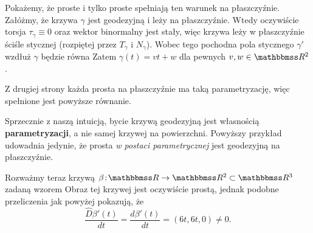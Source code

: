 \begin{frame}

\begin{przyklad} 
Pokażemy, że proste i tylko proste spełniają ten warunek na płaszczyźnie. \pause Załóżmy, że krzywa $\gamma$ jest geodezyjną i leży na płaszczyźnie. Wtedy oczywiście torsja $\tau_\gamma\equiv0$ oraz wektor binormalny jest stały, więc krzywa leży w płaszczyźnie ściśle stycznej (rozpiętej przez $T_\gamma$ i $N_\gamma$). \pause Wobec tego pochodna pola stycznego $\gamma'$ wzdłuż $\gamma$ będzie równa
Zatem $\gamma(t)=vt+w$ dla pewnych $v,w\in \R^2$.

\pause Z drugiej strony każda prosta na płaszczyźnie ma taką parametryzację, więc spełnione jest powyższe równanie.
\end{przyklad}

\end{frame}
\begin{frame}

\begin{uwaga}
Sprzecznie z naszą intuicją, bycie krzywą geodezyjną jest własnością \textbf{parametryzacji}, a nie samej krzywej na powierzchni. Powyższy przykład udowadnia jedynie, że prosta \textit{w postaci parametrycznej} jest geodezyjną na płaszczyźnie. \pause 

\bigskip
Rozważmy teraz krzywą $\beta\colon \R\to \R^2\subset \R^3$ zadaną wzorem
 Obraz tej krzywej jest oczywiście prostą, jednak podobne przeliczenia jak powyżej pokazują, że \[\frac{\widehat{D}\beta'(t)}{dt}=\frac{d\beta'(t)}{dt}=(6t,6t,0)\neq 0.\]
\end{uwaga}

\end{frame}
